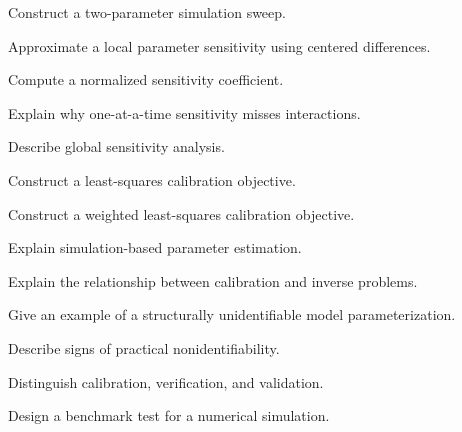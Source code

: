 \begin{exercise}[3]
Construct a two-parameter simulation sweep.
\end{exercise}

\begin{exercise}[3]
Approximate a local parameter sensitivity using centered differences.
\end{exercise}

\begin{exercise}[3]
Compute a normalized sensitivity coefficient.
\end{exercise}

\begin{exercise}[3]
Explain why one-at-a-time sensitivity misses interactions.
\end{exercise}

\begin{exercise}[3]
Describe global sensitivity analysis.
\end{exercise}

\begin{exercise}[2]
Construct a least-squares calibration objective.
\end{exercise}

\begin{exercise}[3]
Construct a weighted least-squares calibration objective.
\end{exercise}

\begin{exercise}[3]
Explain simulation-based parameter estimation.
\end{exercise}

\begin{exercise}[3]
Explain the relationship between calibration and inverse problems.
\end{exercise}

\begin{exercise}[3]
Give an example of a structurally unidentifiable model parameterization.
\end{exercise}

\begin{exercise}[3]
Describe signs of practical nonidentifiability.
\end{exercise}

\begin{exercise}[3]
Distinguish calibration, verification, and validation.
\end{exercise}

\begin{exercise}[3]
Design a benchmark test for a numerical simulation.
\end{exercise}

